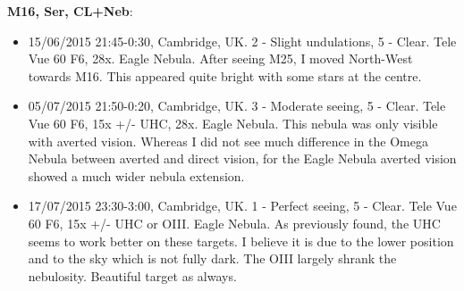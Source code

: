 {\bf M16, Ser, CL+Neb}:
\begin{itemize}
\item 15/06/2015 21:45-0:30, Cambridge, UK. 2 - Slight undulations, 5 - Clear. Tele Vue 60 F6, 28x. Eagle Nebula. After seeing M25, I moved North-West towards M16. This appeared quite bright with some stars at the centre. 
\item 05/07/2015 21:50-0:20, Cambridge, UK. 3 - Moderate seeing, 5 - Clear. Tele Vue 60 F6, 15x +/- UHC, 28x. Eagle Nebula. This nebula was only visible with averted vision. Whereas I did not see much difference in the Omega Nebula between averted and direct vision, for the Eagle Nebula averted vision showed a much wider nebula extension.
\item 17/07/2015 23:30-3:00, Cambridge, UK. 1 - Perfect seeing, 5 - Clear. Tele Vue 60 F6, 15x +/- UHC or OIII. Eagle Nebula. As previously found, the UHC seems to work better on these targets. I believe it is due to the lower position and to the sky which is not fully dark. The OIII largely shrank the nebulosity. Beautiful target as always.
\end{itemize}
